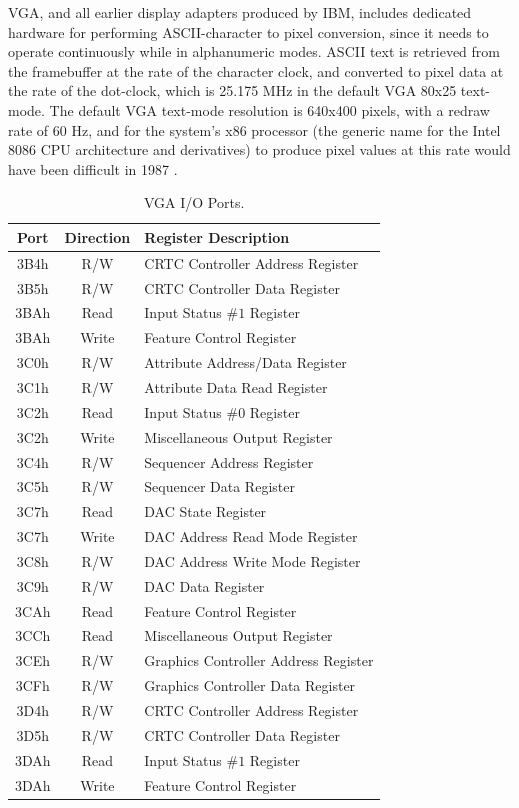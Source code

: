 VGA, and all earlier display adapters produced by IBM, includes dedicated
hardware for performing ASCII-character to pixel conversion, since it needs to
operate continuously while in alphanumeric modes. ASCII text is retrieved from
the framebuffer at the rate of the character clock, and converted to pixel data
at the rate of the dot-clock, which is 25.175 MHz in the default VGA 80x25
text-mode. The default VGA text-mode resolution is 640x400 pixels, with a redraw
rate of 60 Hz, and for the system's x86 processor (the generic name for the Intel
8086 CPU architecture and derivatives) to produce pixel values at this rate would have been difficult
in 1987 .

\begin{table}[h!]
\begin{center}
\begin{tabular}{c | c l}
Port & Direction & Register Description \\
\hline
3B4h & R/W & CRTC Controller Address Register \\
3B5h & R/W & CRTC Controller Data Register \\
3BAh & Read & Input Status $\#1$ Register \\
3BAh & Write & Feature Control Register \\
3C0h & R/W & Attribute Address/Data Register \\
3C1h & R/W & Attribute Data Read Register \\
3C2h & Read & Input Status $\#0$ Register \\
3C2h & Write & Miscellaneous Output Register \\
3C4h & R/W & Sequencer Address Register \\
3C5h & R/W & Sequencer Data Register \\
3C7h & Read & DAC State Register \\
3C7h & Write & DAC Address Read Mode Register \\
3C8h & R/W & DAC Address Write Mode Register \\
3C9h & R/W & DAC Data Register \\
3CAh & Read & Feature Control Register \\
3CCh & Read & Miscellaneous Output Register \\
3CEh & R/W & Graphics Controller Address Register \\
3CFh & R/W & Graphics Controller Data Register \\
3D4h & R/W & CRTC Controller Address Register \\
3D5h & R/W & CRTC Controller Data Register \\
3DAh & Read & Input Status $\#1$ Register \\
3DAh & Write & Feature Control Register \\
\end{tabular}
\end{center}
\caption[VGA I/O Ports]{VGA I/O Ports.}
\label{PCI_VGA_Port_Table}
\end{table}

